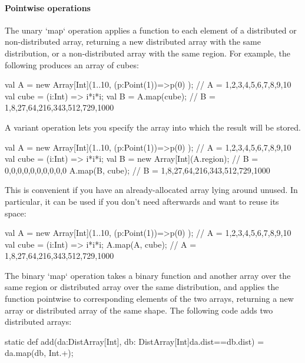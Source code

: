 \paragraph{Pointwise operations}\label{ArrayPointwise}
The unary \xcd`map` operation applies a function to each element of
a distributed or non-distributed array, returning a new distributed array with
the same distribution, or a non-distributed array with the same region.
For example, the following produces an array of cubes: 
\begin{xten}
val A = new Array[Int](1..10, (p:Point(1))=>p(0) );
// A = 1,2,3,4,5,6,7,8,9,10
val cube = (i:Int) => i*i*i;
val B = A.map(cube);
// B = 1,8,27,64,216,343,512,729,1000
\end{xten}

A variant operation lets you specify the array  into which the result
will be stored.   
\begin{xten}
val A = new Array[Int](1..10, (p:Point(1))=>p(0) );
// A = 1,2,3,4,5,6,7,8,9,10
val cube = (i:Int) => i*i*i;
val B = new Array[Int](A.region); // B = 0,0,0,0,0,0,0,0,0,0
A.map(B, cube);
// B = 1,8,27,64,216,343,512,729,1000
\end{xten}
\noindent
This is convenient if you have an already-allocated array lying around unused.
In particular, it can be used if you don't need  afterwards and want to
reuse its space:
\begin{xten}
val A = new Array[Int](1..10, (p:Point(1))=>p(0) );
// A = 1,2,3,4,5,6,7,8,9,10
val cube = (i:Int) => i*i*i;
A.map(A, cube);
// A = 1,8,27,64,216,343,512,729,1000
\end{xten}


The binary \xcd`map` operation takes a binary function and
another
array over the same region or distributed array over the same  distribution,
and applies the function 
pointwise to corresponding elements of the two arrays, returning
a new array or distributed array of the same shape.
The following code adds two distributed arrays: 
\begin{xten}
static def add(da:DistArray[Int], db: DistArray[Int]{da.dist==db.dist})
    = da.map(db, Int.+);
\end{xten}




